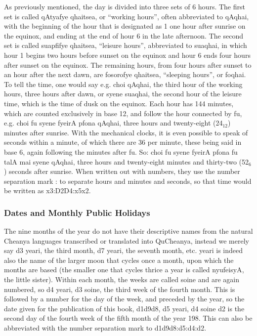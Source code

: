 \documentclass{article}
\begin{document}
As previously mentioned, the day is divided into three sets of 6 hours.  The first set is called {\quch qAtyafye qhaitsea}, or ``working hours'', often abbreviated to {\quch qAqhai}, with the beginning of the hour that is designated as 1 one hour after sunrise on the equinox, and ending at the end of hour 6 in the late afternoon.  The second set is called {\quch suapfifye qhaitsea}, ``leisure hours'', abbreviated to {\quch suaqhai}, in which hour 1 begins two hours before sunset on the equinox and hour 6 ends four hours after sunset on the equinox.  The remaining hours, from four hours after sunset to an hour after the next dawn, are {\quch fosorofye qhaitsea}, ``sleeping hours'', or {\quch foqhai}.  To tell the time, one would say e.g. {\quch choi qAqhai}, the third hour of the working hours, three hours after dawn, or {\quch syene suaqhai}, the second hour of the leisure time, which is the time of dusk on the equinox.  Each hour has 144 minutes, which are counted exclusively in base 12, and follow the hour connected by {\quch fu}, e.g. {\quch choi fu syene fyeirA pfona qAqhai}, three hours and twenty-eight (24$_{12}$) minutes after sunrise.  With the mechanical clocks, it is even possible to speak of seconds within a minute, of which there are 36 per minute, these being said in base 6, again following the minutes after {\quch fu}.  So: {\quch choi fu syene fyeirA pfona fu talA mai syene qAqhai}, three hours and twenty-eight minutes and thirty-two (52$_6$) seconds after sunrise.  When written out with numbers, they use the number separation mark {\quch :} to separate hours and minutes and seconds, so that time would be written as {\quch x3:D2D4:x5x2}.

\subsubsection{Dates and Monthly Public Holidays}

The nine months of the year do not have their descriptive names from the natural Cheanya languages transcribed or translated into QuCheanya, instead we merely say {\quch d3 yeari}, the third month, {\quch d7 yeari}, the seventh month, etc.  {\quch yeari} is indeed also the name of the larger moon that cycles once a month, upon which the months are based (the smaller one that cycles thrice a year is called {\quch nyufeisyA}, the little sister).  Within each month, the weeks are called {\quch soine} and are again numbered, so {\quch d4 yeari, d3 soine}, the third week of the fourth month.  This is followed by a number for the day of the week, and preceded by the year, so the date given for the publication of this book, {\quch d1d9d8, d5 yeari, d4 soine d2} is the second day of the fourth week of the fifth month of the year 198.  This can also be abbreviated with the number separation mark to {\quch d1d9d8:d5:d4:d2}.
\end{document}
